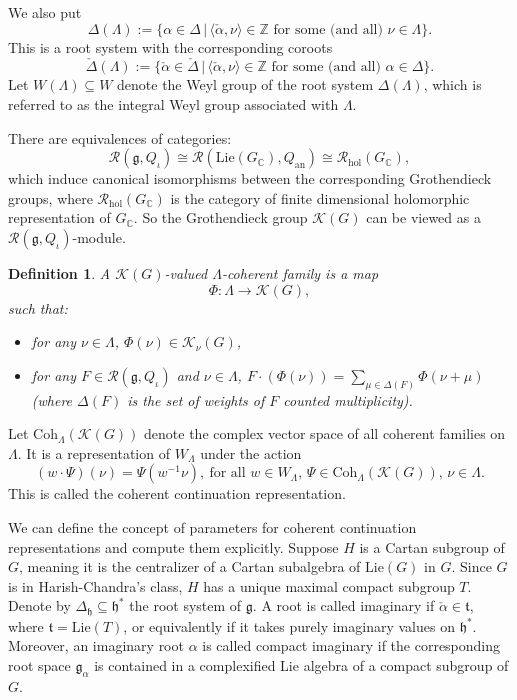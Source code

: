 \documentclass[12pt, a4paper]{amsart}
\numberwithin{equation}{section}
\newtheorem{defn}[thm]{Definition}
\newcommand{\BC}{{\mathbb {C}}}
\newcommand{\BZ}{{\mathbb {Z}}}
\newcommand{\CK}{{\mathcal {K}}}
\newcommand{\CR}{{\mathcal {R}}}
\newcommand{\fg}{\mathfrak{g}}
\newcommand{\fh}{\mathfrak{h}}
\newcommand{\ft}{\mathfrak{t}}
\newcommand{\set}[2]{\{#1\,|\,#2\}}
\begin{document}
We also put 
\begin{equation}
    \Delta(\Lambda) := \set{\alpha \in \Delta}{\textrm{$\langle \check{\alpha} , \nu \rangle \in \BZ$ for some (and all) $\nu \in \Lambda$}}.
\end{equation}
This is a root system with the corresponding coroots 
\begin{equation}
    \check{\Delta}(\Lambda) := \set{\check{\alpha} \in \check{\Delta}}{\textrm{$\langle \check{\alpha}, \nu \rangle \in \BZ$ for some (and all) $\alpha \in \Delta$}}.
\end{equation}
Let $W(\Lambda) \subseteq W$ denote the Weyl group of the root system $\Delta(\Lambda)$, which is referred to as the integral Weyl group associated with $\Lambda$.

There are equivalences of categories:
\begin{equation}
   \CR(\fg, Q_{\iota}) \cong \CR(\mathrm{Lie}(G_\BC),Q_{\mathrm{an}}) \cong \CR_{\mathrm{hol}}(G_{\BC}),
\end{equation}
which induce canonical isomorphisms between the corresponding Grothendieck groups, where $\CR_{\mathrm{hol}}(G_{\BC})$ is the category of finite dimensional holomorphic representation of $G_{\BC}$. So the Grothendieck group $\CK(G)$ can be viewed as a $\CR(\fg, Q_{\iota})$-module.
\begin{defn}
   A $\CK(G)$-valued $\Lambda$-coherent family is a map
   $$\Phi: \Lambda \to \CK(G),$$
   such that:
   \begin{itemize}
      \item for any $\nu \in \Lambda$, $\Phi(\nu) \in \CK_{\nu}(G)$,
      \item for any $F \in \CR(\fg, Q_{\iota})$ and $\nu \in \Lambda$, $F \cdot (\Phi(\nu)) = \sum_{\mu \in \Delta(F)} \Phi(\nu + \mu)$ (where $\Delta(F)$ is the set of weights of $F$ counted multiplicity).
   \end{itemize}
\end{defn}

Let $\mathrm{Coh}_{\Lambda}(\CK(G))$ denote the complex vector space of all coherent families on $\Lambda$. It is a representation of $W_{\Lambda}$ under the action
$$(w \cdot \Psi)(\nu) = \Psi(w^{-1}\nu), \ \textrm{for all $w \in W_{\Lambda}$, $\Psi \in \mathrm{Coh}_{\Lambda}(\CK(G))$, $\nu \in \Lambda$.}$$
This is called the coherent continuation representation.

We can define the concept of parameters for coherent continuation representations and compute them explicitly.
Suppose $H$ is a Cartan subgroup of $G$, meaning it is the centralizer of a Cartan subalgebra of $\mathrm{Lie}(G)$ in $G$. Since $G$ is in Harish-Chandra's class, $H$ has a unique maximal compact subgroup $T$. Denote by $\Delta_{\fh} \subseteq \fh^*$ the root system of $\fg$. A root is called imaginary if $\check{\alpha} \in \ft$, where $\ft = \mathrm{Lie}(T)$, or equivalently if it takes purely imaginary values on $\fh^*$. Moreover, an imaginary root $\alpha$ is called compact imaginary if the corresponding root space $\fg_{\alpha}$ is contained in a complexified Lie algebra of a compact subgroup of $G$.
\end{document}
